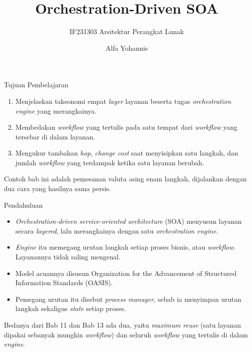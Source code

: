 \documentclass[aspectratio=169, table, 12pt]{beamer}
\title{\Huge{Orchestration-Driven SOA}}
\subtitle{IF231303 Arsitektur Perangkat Lunak}
\author{Alfa Yohannis}
\begin{document}
\frame{\titlepage}

\begin{frame}{{\Large Tujuan Pembelajaran}}
  \vspace{10pt}
  \begin{enumerate}
    \item Menjelaskan taksonomi empat \textit{layer} layanan beserta tugas
          \textit{orchestration engine} yang merangkainya.
    \item Membedakan \textit{workflow} yang tertulis pada satu tempat dari
          \textit{workflow} yang tersebar di dalam layanan.
    \item Mengukur tambahan \textit{hop}, \textit{change cost} saat menyisipkan
          satu langkah, dan jumlah \textit{workflow} yang terdampak ketika satu
          layanan berubah.
  \end{enumerate}

  \vspace{10pt}
  {\small Contoh bab ini adalah pemesanan valuta asing enam langkah, dijalankan
  dengan dua cara yang hasilnya sama persis.}
\end{frame}

\begin{frame}{{\Large Pendahuluan}}
  \vspace{8pt}
  \begin{itemize}\small
    \item \textit{Orchestration-driven service-oriented architecture} (SOA)
          menyusun layanan secara \textit{layered}, lalu merangkainya dengan
          satu \textit{orchestration engine}.
    \item \textit{Engine} itu memegang urutan langkah setiap proses bisnis, atau
          \textit{workflow}. Layanannya tidak saling mengenal.
    \item Model acuannya disusun Organization for the Advancement of Structured
          Information Standards (OASIS).
    \item Pemegang urutan itu disebut \textit{process manager}, sebab ia
          menyimpan urutan langkah sekaligus \textit{state} setiap proses.
  \end{itemize}

  \vspace{8pt}
  {\small Bedanya dari Bab 11 dan Bab 13 ada dua, yaitu \textit{maximum reuse}
  (satu layanan dipakai sebanyak mungkin \textit{workflow}) dan seluruh
  \textit{workflow} yang tertulis di dalam \textit{engine}.}
\end{frame}
\end{document}
